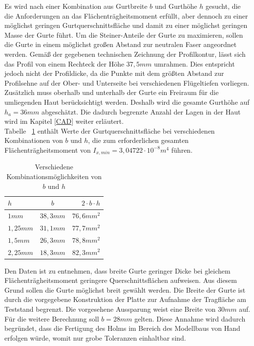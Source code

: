 \noindent Es wird nach einer Kombination aus Gurtbreite $ b $ und Gurthöhe $ h $ gesucht, die die Anforderungen an das Flächenträgheitsmoment erfüllt, aber dennoch zu einer möglichst geringen Gurtquerschnittsfläche und damit zu einer möglichst geringen Masse der Gurte führt. Um die Steiner-Anteile der Gurte zu maximieren, sollen die Gurte in einem möglichst großen Abstand zur neutralen Faser angeordnet werden. Gemäß der gegebenen technischen Zeichnung der Profilkontur, lässt sich das Profil von einem Rechteck der Höhe $ 37,5mm $ umrahmen. Dies entspricht jedoch nicht der Profildicke, da die Punkte mit dem größten Abstand zur Profilsehne auf der Ober- und Unterseite bei verschiedenen Flügeltiefen vorliegen. Zusätzlich muss oberhalb und unterhalb der Gurte ein Freiraum für die umliegenden Haut berücksichtigt werden. Deshalb wird die gesamte Gurthöhe auf $ h_{a}=36mm $ abgeschätzt. Die dadurch begrenzte Anzahl der Lagen in der Haut wird im Kapitel \ref{CAD} weiter erläutert.\\ 

\noindent Tabelle ~\ref{bh} enthält Werte der Gurtquerschnittsfläche bei verschiedenen Kombinationen von $ b $ und $ h $, die zum erforderlichen gesamten Flächenträgheitsmoment von $ I_{x,min} = 3,04722 \cdot 10^{-8} m^{4} $ führen.\\
\begin{table}[h]
	\caption{Verschiedene Kombinationsmöglichkeiten von $ b $ und $ h $}
	\label{bh}
	\begin{center}
		\begin{tabular}{l|c|r}
			$h$&$b$&$2\cdot b\cdot h$\\
			\hline
			$1mm$&$38,3mm$&$76,6mm^{2}$\\
			$1,25mm$&$31,1mm$&$77,7mm^{2}$\\
			$1,5mm$&$26,3mm$&$78,8mm^{2}$\\
			$2,25mm$&$18,3mm$&$82,3mm^{2}$\\
		\end{tabular}
	\end{center}
\end{table}

\noindent Den Daten ist zu entnehmen, dass breite Gurte geringer Dicke bei gleichem Flächenträgheitsmoment geringere Querschnittsflächen aufweisen. Aus diesem Grund sollen die Gurte möglichst breit gewählt werden. Die Breite der Gurte ist durch die vorgegebene Konstruktion der Platte zur Aufnahme der Tragfläche am Teststand begrenzt. Die vorgesehene Aussparung weist eine Breite von $ 30mm $ auf. Für die weitere Berechnung soll $ b=28mm $ gelten. Diese Annahme wird dadurch begründet, dass die Fertigung des Holms im Bereich des Modellbaus von Hand erfolgen würde, womit nur grobe Toleranzen einhaltbar sind.\\

